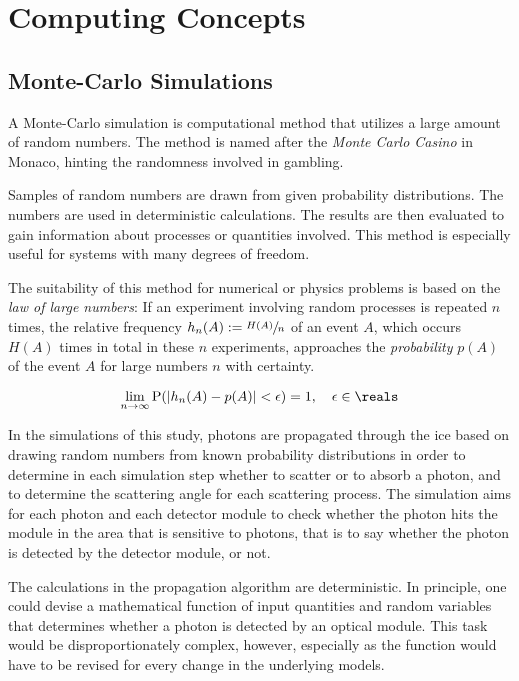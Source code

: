 
\section{Computing Concepts}
\label{sec:simulation_background}

\subsection{Monte-Carlo Simulations}
\label{sec:monte_carlo}


A Monte-Carlo simulation is computational method that utilizes a large amount of random numbers. The method is named after the \textit{Monte Carlo Casino} in Monaco, hinting the randomness involved in gambling. \cite{physiklexikon}

Samples of random numbers are drawn from given probability distributions. The numbers are used in deterministic calculations. The results are then evaluated to gain information about processes or quantities involved. This method is especially useful for systems with many degrees of freedom. \cite{physiklexikon}

The suitability of this method for numerical or physics problems is based on the \textit{law of large numbers}: If an experiment involving random processes is repeated $n$ times, the relative frequency $h_n(A):=\sfrac{H(A)}{n}$ of an event $A$, which occurs $H(A)$ times in total in these $n$ experiments, approaches the \textit{probability} $p(A)$ of the event $A$ for large numbers $n$ with certainty. \cite{physiklexikon}

$$
  \lim_{n \rightarrow \infty} \text{P}(|h_n(A) - p(A)| < \epsilon) = 1, \ \ \ \epsilon \in \reals
$$

In the simulations of this study, photons are propagated through the ice based on drawing random numbers from known probability distributions in order to determine in each simulation step whether to scatter or to absorb a photon, and to determine the scattering angle for each scattering process. The simulation aims for each photon and each detector module to check whether the photon hits the module in the area that is sensitive to photons, that is to say whether the photon is detected by the detector module, or not.

The calculations in the propagation algorithm are deterministic. In principle, one could devise a mathematical function of input quantities and random variables that determines whether a photon is detected by an optical module. This task would be disproportionately complex, however, especially as the function would have to be revised for every change in the underlying models.

